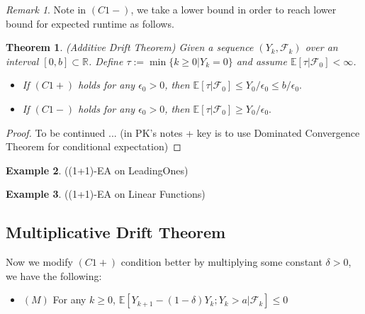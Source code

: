 \documentclass[a4paper,11pt]{report}
\theoremstyle{plain} %
\newtheorem{thm}{Theorem}[section]
\theoremstyle{definition} %
\newtheorem{eg}[thm]{Example}
\theoremstyle{remark} %
\newtheorem*{rem}{Remark}
\begin{document}
\begin{rem}
Note in $(C1-)$, we take a lower bound in order to reach lower bound for expected runtime as follows.
\end{rem}
\begin{thm}(Additive Drift Theorem)
Given a sequence $(Y_{k},\mathcal{F}_{k})$ over an interval $[0,b]\subset \mathbb{R}$. Define $\tau :=\min\{k \geq 0 | Y_{k}=0 \}$ and assume $\mathbb{E}[\tau | \mathcal{F}_{0}]<\infty$. 

\begin{itemize}
    \item If $(C1+)$ holds for any $\epsilon_{0}>0$, then  $\mathbb{E}[\tau | \mathcal{F}_{0}]\leq Y_{0}/ \epsilon_{0} \leq b / \epsilon_{0}.$
     \item If $(C1-)$ holds for any $\epsilon_{0}>0$, then  $\mathbb{E}[\tau | \mathcal{F}_{0}]\geq Y_{0}/ \epsilon_{0}.$
\end{itemize}

\end{thm}

\begin{proof}
To be continued ... (in PK's notes + key is to use Dominated Convergence Theorem for conditional expectation)
\end{proof}

\begin{eg} \big((1+1)-EA on LeadingOnes\big)

\end{eg}

\begin{eg} \big((1+1)-EA on Linear Functions\big)

\end{eg}

\subsection{Multiplicative Drift Theorem}
\par Now we modify $(C1+)$ condition better by multiplying some constant $\delta>0$, we have the following:
\begin{itemize}
    \item $(M)$ For any $k\geq 0$, $\mathbb{E}[Y_{k+1}-(1-\delta) Y_{k}; Y_{k}>a| \mathcal{F}_{k} ]\leq 0$
\end{itemize}
\end{document}
